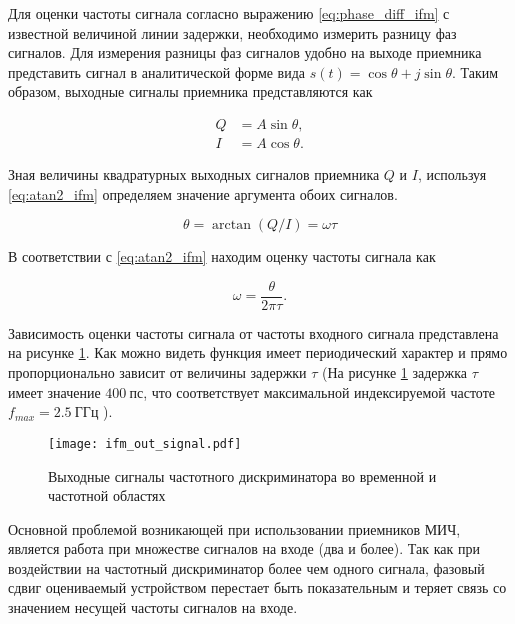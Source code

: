 Для оценки частоты сигнала согласно выражению \eqref{eq:phase_diff_ifm} с известной величиной линии задержки, необходимо измерить разницу фаз сигналов. Для измерения разницы фаз сигналов удобно на выходе приемника представить сигнал в аналитической форме вида \( s(t) = \cos{\theta} + j \sin{\theta} \). Таким образом, выходные сигналы приемника представляются как

\begin{equation}
	\begin{aligned}
		Q &= A \sin{\theta}, \\
		I &= A \cos{\theta}.
	\end{aligned}
	\label{eq:quadrature_ifm}
\end{equation}

Зная величины квадратурных выходных сигналов приемника \(Q\) и \(I\), используя \eqref{eq:atan2_ifm} определяем значение аргумента обоих сигналов.

\begin{equation}
	\theta = \arctan(Q/I) = \omega \tau
	\label{eq:atan2_ifm}
\end{equation}

В соответствии с \eqref{eq:atan2_ifm} находим оценку частоты сигнала как

\begin{equation}
	\omega = \frac{\theta}{2 \pi \tau}.
	\label{eq:ifm_freq_estimation}
\end{equation}

Зависимость оценки частоты сигнала от частоты входного сигнала представлена на рисунке \ref{ct:ifm_out_signal}. Как можно видеть функция имеет периодический характер и прямо пропорционально зависит от величины задержки \(\tau\) (На рисунке \ref{ct:ifm_out_signal} задержка \(\tau \) имеет значение \(400~\textrm{пс}\), что соответствует максимальной индексируемой частоте \(f_{max} = 2.5~\textrm{ГГц}\) ).

\begin{figure}[ht]
	\centering
	\texttt{[image: ifm\_out\_signal.pdf]}
	
	\caption{Выходные сигналы частотного дискриминатора во временной и частотной областях}
	\label{ct:ifm_out_signal}
\end{figure}

Основной проблемой возникающей при использовании приемников МИЧ, является работа при множестве сигналов на входе (два и более). Так как при воздействии на частотный дискриминатор более чем одного сигнала, фазовый сдвиг оцениваемый устройством перестает быть показательным и теряет связь со значением несущей частоты сигналов на входе.

